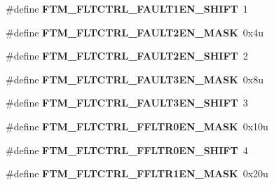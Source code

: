 \begin{DoxyCompactItemize}
\item 
\#define {\bfseries F\+T\+M\+\_\+\+F\+L\+T\+C\+T\+R\+L\+\_\+\+F\+A\+U\+L\+T1\+E\+N\+\_\+\+S\+H\+I\+FT}~1\hypertarget{group__FTM__Register__Masks_ga35e4d4e03c8a8bc735f9a816f85665e6}{}\label{group__FTM__Register__Masks_ga35e4d4e03c8a8bc735f9a816f85665e6}

\item 
\#define {\bfseries F\+T\+M\+\_\+\+F\+L\+T\+C\+T\+R\+L\+\_\+\+F\+A\+U\+L\+T2\+E\+N\+\_\+\+M\+A\+SK}~0x4u\hypertarget{group__FTM__Register__Masks_ga1e35c0281db74fb68969c15377596ea5}{}\label{group__FTM__Register__Masks_ga1e35c0281db74fb68969c15377596ea5}

\item 
\#define {\bfseries F\+T\+M\+\_\+\+F\+L\+T\+C\+T\+R\+L\+\_\+\+F\+A\+U\+L\+T2\+E\+N\+\_\+\+S\+H\+I\+FT}~2\hypertarget{group__FTM__Register__Masks_gaf41dd0966742f642b633ce812a13bfc7}{}\label{group__FTM__Register__Masks_gaf41dd0966742f642b633ce812a13bfc7}

\item 
\#define {\bfseries F\+T\+M\+\_\+\+F\+L\+T\+C\+T\+R\+L\+\_\+\+F\+A\+U\+L\+T3\+E\+N\+\_\+\+M\+A\+SK}~0x8u\hypertarget{group__FTM__Register__Masks_ga5b3b4ac103a4459ae5ef09d3d83a2352}{}\label{group__FTM__Register__Masks_ga5b3b4ac103a4459ae5ef09d3d83a2352}

\item 
\#define {\bfseries F\+T\+M\+\_\+\+F\+L\+T\+C\+T\+R\+L\+\_\+\+F\+A\+U\+L\+T3\+E\+N\+\_\+\+S\+H\+I\+FT}~3\hypertarget{group__FTM__Register__Masks_ga19ffec80742795f21edc0cb15a74cff6}{}\label{group__FTM__Register__Masks_ga19ffec80742795f21edc0cb15a74cff6}

\item 
\#define {\bfseries F\+T\+M\+\_\+\+F\+L\+T\+C\+T\+R\+L\+\_\+\+F\+F\+L\+T\+R0\+E\+N\+\_\+\+M\+A\+SK}~0x10u\hypertarget{group__FTM__Register__Masks_ga08d69ad3bf701debb5a53bfadbc7031d}{}\label{group__FTM__Register__Masks_ga08d69ad3bf701debb5a53bfadbc7031d}

\item 
\#define {\bfseries F\+T\+M\+\_\+\+F\+L\+T\+C\+T\+R\+L\+\_\+\+F\+F\+L\+T\+R0\+E\+N\+\_\+\+S\+H\+I\+FT}~4\hypertarget{group__FTM__Register__Masks_gae70106a7899ed40bc3d6252a1826e0eb}{}\label{group__FTM__Register__Masks_gae70106a7899ed40bc3d6252a1826e0eb}

\item 
\#define {\bfseries F\+T\+M\+\_\+\+F\+L\+T\+C\+T\+R\+L\+\_\+\+F\+F\+L\+T\+R1\+E\+N\+\_\+\+M\+A\+SK}~0x20u\hypertarget{group__FTM__Register__Masks_ga0f14665d0a31ab1137dc4988671225a2}{}\label{group__FTM__Register__Masks_ga0f14665d0a31ab1137dc4988671225a2}


\end{DoxyCompactItemize}
